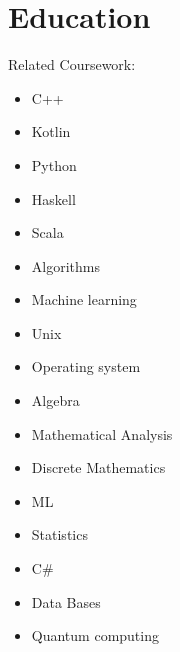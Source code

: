 \documentclass[11pt,a4paper,sans]{moderncv}        %
\begin{document}
	\vspace*{-1.05mm}
	\makecvtitle
	\vspace*{-10mm}
	
	\section{Education}
	{}{Related Coursework:}
	\vspace{-1.0em}\begin{small}
		\begin{multicols}{4}
			\begin{itemize}
				\item C++
				\item Kotlin
				\item Python
				\item Haskell
				\item Scala
				\item Algorithms
				\item Machine learning
				\item Unix
				\item Operating system
				\item Algebra
				\item Mathematical Analysis
				\item Discrete Mathematics
				\item ML
				\item Statistics
				\item C\#
				\item Data Bases
				\item Quantum computing
			\end{itemize}
	\end{multicols}\end{small}
	
\end{document}
